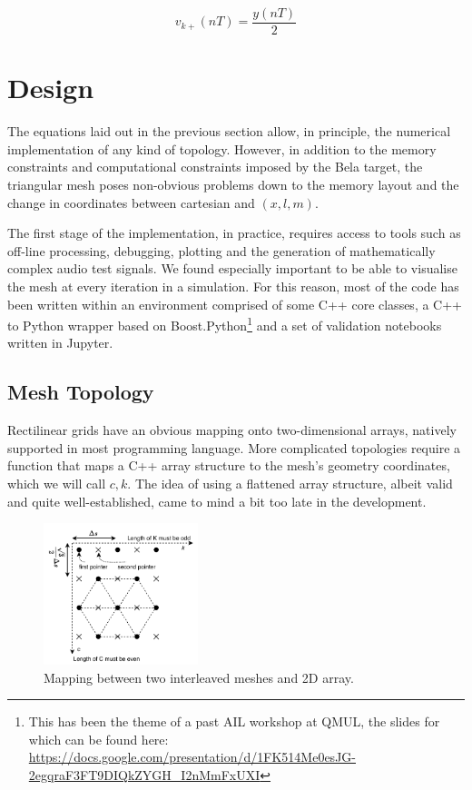 \documentclass{article}
\begin{document}
\begin{equation}\label{eq:inject}
    v_{k+}(nT) = \frac{y(nT)}{2}
\end{equation}

\section{Design}

The equations laid out in the previous section allow, in principle,
the numerical implementation of any kind of topology. However,
in addition to the memory constraints and computational constraints
imposed by the Bela target, the triangular mesh poses non-obvious
problems down to the memory layout and the change in coordinates
between cartesian and \((x, l, m)\).

The first stage of the implementation, in practice, requires
access to tools such as off-line processing,
debugging, plotting and the generation of mathematically complex
audio test signals. We found especially important to be able to
visualise the mesh at every iteration in a simulation.
For this reason, most of the code has been written within an
environment comprised of some C++ core classes, a C++ to Python
wrapper based on
Boost.Python\footnote{
    This has been the theme of a past AIL workshop at QMUL, the
    slides for which can be found here:
    \url{https://docs.google.com/presentation/d/1FK514Me0esJG-2egqraF3FT9DIQkZYGH_I2nMmFxUXI}
}
and a set of validation notebooks
written in Jupyter.

\subsection{Mesh Topology}

Rectilinear grids have an obvious mapping onto two-dimensional arrays,
natively supported in most programming language. More complicated
topologies require a function that maps a C++ array structure to
the mesh's geometry coordinates, which we will call \(c, k\).
The idea of using a flattened array structure, albeit valid
and quite well-established, came to mind a bit too late in
the development.

\begin{figure}
    \centering
    \includegraphics[width=0.4\textwidth]{fig/XYtoCK}
    \caption{Mapping between two interleaved meshes and 2D array.}\label{fig:meshmap}
\end{figure}
\end{document}
